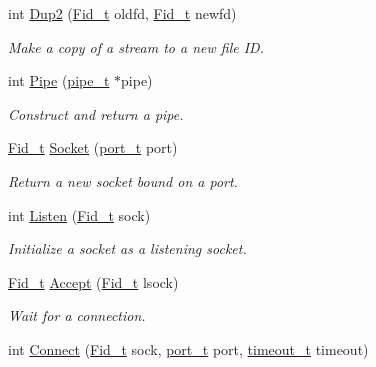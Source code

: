 \begin{DoxyCompactItemize}
int \hyperlink{group__syscalls_gacc048c60209e2dfb4b5cfc1c3f21aa88}{Dup2} (\hyperlink{group__syscalls_ga5097222c5f0da97d92d4712359abc38f}{Fid\+\_\+t} oldfd, \hyperlink{group__syscalls_ga5097222c5f0da97d92d4712359abc38f}{Fid\+\_\+t} newfd)
\begin{DoxyCompactList}\small\item\em Make a copy of a stream to a new file ID. \end{DoxyCompactList}\item 
int \hyperlink{group__syscalls_gab6355ce54e047c31538ed5ed9108b5b3}{Pipe} (\hyperlink{group__syscalls_gad56b5ceaaf7d3ab88b4be7f622314dfb}{pipe\+\_\+t} $\ast$pipe)
\begin{DoxyCompactList}\small\item\em Construct and return a pipe. \end{DoxyCompactList}\item 
\hyperlink{group__syscalls_ga5097222c5f0da97d92d4712359abc38f}{Fid\+\_\+t} \hyperlink{group__syscalls_gadf167321edde68e905173d8056d3eb2f}{Socket} (\hyperlink{group__syscalls_ga13894e5a2ffd5febb7aeb90e87239d61}{port\+\_\+t} port)
\begin{DoxyCompactList}\small\item\em Return a new socket bound on a port. \end{DoxyCompactList}\item 
int \hyperlink{group__syscalls_ga9ff5bae3e7b9e5bbf5a788a5ff739bf7}{Listen} (\hyperlink{group__syscalls_ga5097222c5f0da97d92d4712359abc38f}{Fid\+\_\+t} sock)
\begin{DoxyCompactList}\small\item\em Initialize a socket as a listening socket. \end{DoxyCompactList}\item 
\hyperlink{group__syscalls_ga5097222c5f0da97d92d4712359abc38f}{Fid\+\_\+t} \hyperlink{group__syscalls_ga8116ee944d1b03b6fb2fdba59b57d4a8}{Accept} (\hyperlink{group__syscalls_ga5097222c5f0da97d92d4712359abc38f}{Fid\+\_\+t} lsock)
\begin{DoxyCompactList}\small\item\em Wait for a connection. \end{DoxyCompactList}\item 
int \hyperlink{group__syscalls_ga747ceadd43e9a4c72b08fffbadaefbdd}{Connect} (\hyperlink{group__syscalls_ga5097222c5f0da97d92d4712359abc38f}{Fid\+\_\+t} sock, \hyperlink{group__syscalls_ga13894e5a2ffd5febb7aeb90e87239d61}{port\+\_\+t} port, \hyperlink{group__syscalls_gaf412159e5cef839836a5e7b19ee75d1c}{timeout\+\_\+t} timeout)

\end{DoxyCompactItemize}
